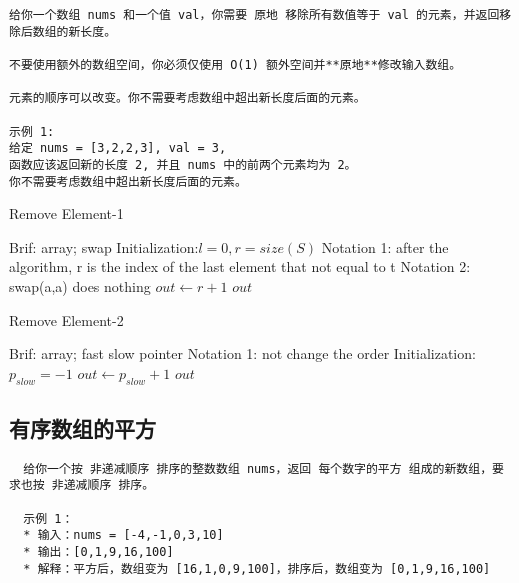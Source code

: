 \documentclass[UTF8]{../computerUniverse}
\begin{document}
\begin{lstlisting}
给你一个数组 nums 和一个值 val，你需要 原地 移除所有数值等于 val 的元素，并返回移除后数组的新长度。

不要使用额外的数组空间，你必须仅使用 O(1) 额外空间并**原地**修改输入数组。

元素的顺序可以改变。你不需要考虑数组中超出新长度后面的元素。

示例 1:
给定 nums = [3,2,2,3], val = 3,
函数应该返回新的长度 2, 并且 nums 中的前两个元素均为 2。
你不需要考虑数组中超出新长度后面的元素。

\end{lstlisting}

\begin{algorithm}[h]%
  \caption{Remove Element-1}\label{algo:Remove Element-1}
  \SetAlgoLined
  Brif: array; swap\;
  Initialization:$l = 0, r = size(S)$\;
  Notation 1: after the algorithm, r is the index of the last element that not equal to t\;
  Notation 2: swap(a,a) does nothing \;
  \KwIn{set $S = [l,r), l = S[0]$,  the removed number $t$.}
  $out \leftarrow r+1$\;
  \KwRet $out$\;
\end{algorithm}

\begin{algorithm}[h]%
  \caption{Remove Element-2}\label{algo:Remove Element-2}
  \SetAlgoLined
  Brif: array; fast slow pointer\;
  Notation 1: not change the order\;
  \KwIn{set $S = [l,r), l = S[0]$,  the removed number $t$.}
  Initialization:$p_{slow} = -1$\;
  \For {$p_{fast} : [0, size(S))$}{
   
    \If{$S[p_{fast}] \neq t$}{
      $p_{slow} \leftarrow p_{slow} +1$\;
      $ S[p_{slow}] = S[p_{fast}] $\;
    }
  }
  $out \leftarrow p_{slow}+1$\;
  \KwRet $out$\;
\end{algorithm}


\subsection{有序数组的平方}

\begin{lstlisting}
  给你一个按 非递减顺序 排序的整数数组 nums，返回 每个数字的平方 组成的新数组，要求也按 非递减顺序 排序。

  示例 1：
  * 输入：nums = [-4,-1,0,3,10]
  * 输出：[0,1,9,16,100]
  * 解释：平方后，数组变为 [16,1,0,9,100]，排序后，数组变为 [0,1,9,16,100]

\end{lstlisting}
\end{document}
